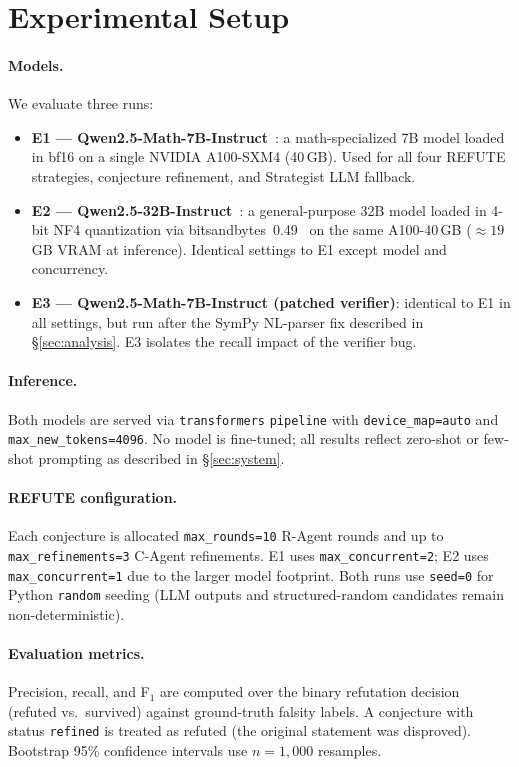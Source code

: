 \section{Experimental Setup}
\label{sec:experiments}

\paragraph{Models.}
We evaluate three runs:
\begin{itemize}[noitemsep]
  \item \textbf{E1 — Qwen2.5-Math-7B-Instruct}~\citep{qwen2025math}:
    a math-specialized 7B model loaded in bf16 on a single NVIDIA A100-SXM4
    (40\,GB).
    Used for all four REFUTE strategies, conjecture refinement, and
    Strategist LLM fallback.
  \item \textbf{E2 — Qwen2.5-32B-Instruct}~\citep{qwen2025}:
    a general-purpose 32B model loaded in 4-bit NF4 quantization via
    bitsandbytes~0.49~\citep{dettmers2023qlora} on the same A100-40\,GB
    (${\approx}19$\,GB VRAM at inference).
    Identical settings to E1 except model and concurrency.
  \item \textbf{E3 — Qwen2.5-Math-7B-Instruct (patched verifier)}:
    identical to E1 in all settings, but run after the SymPy NL-parser fix
    described in \S\ref{sec:analysis}.
    E3 isolates the recall impact of the verifier bug.
\end{itemize}

\paragraph{Inference.}
Both models are served via \texttt{transformers} \texttt{pipeline} with
\texttt{device\_map=auto} and \texttt{max\_new\_tokens=4096}.
No model is fine-tuned; all results reflect zero-shot or few-shot prompting
as described in \S\ref{sec:system}.

\paragraph{REFUTE configuration.}
Each conjecture is allocated \texttt{max\_rounds=10} R-Agent rounds and up to
\texttt{max\_refinements=3} C-Agent refinements.
E1 uses \texttt{max\_concurrent=2}; E2 uses \texttt{max\_concurrent=1} due to
the larger model footprint.
Both runs use \texttt{seed=0} for Python \texttt{random} seeding
(LLM outputs and structured-random candidates remain non-deterministic).

\paragraph{Evaluation metrics.}
Precision, recall, and F$_1$ are computed over the binary refutation
decision (refuted vs.\ survived) against ground-truth falsity labels.
A conjecture with status \texttt{refined} is treated as refuted
(the original statement was disproved).
Bootstrap 95\% confidence intervals use $n=1{,}000$ resamples.
